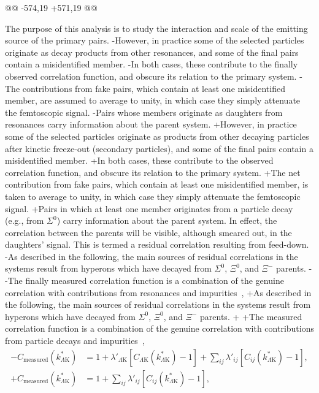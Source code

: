 @@ -574,19 +571,19 @@
 \label{ResidualCorrelations}
 
 The purpose of this analysis is to study the interaction and scale of the emitting source of the primary \LamK pairs.
-However, in practice some of the selected particles originate as decay products from other resonances, and some of the final pairs contain a misidentified member.
-In both cases, these contribute to the finally observed correlation function, and obscure its relation to the primary \LamK system.
-The contributions from fake pairs, which contain at least one misidentified member, are assumed to average to unity, in which case they simply attenuate the femtoscopic signal.
-Pairs whose members originate as daughters from resonances carry information about the parent system.
+However, in practice some of the selected particles originate as products from other decaying particles after kinetic freeze-out (secondary particles), and some of the final pairs contain a misidentified member.
+In both cases, these contribute to the observed correlation function, and obscure its relation to the primary \LamK system.
+The net contribution from fake pairs, which contain at least one misidentified member, is taken to average to unity, in which case they simply attenuate the femtoscopic signal.
+Pairs in which at least one member originates from a particle decay (e.g., \LamKchP from $\Sigma^{0}$\KchP) carry information about the parent system.
 In effect, the correlation between the parents will be visible, although smeared out, in the daughters' signal.
 This is termed a residual correlation resulting from feed-down.  
-As described in the following, the main sources of residual correlations in the \LamK systems result from \Lam hyperons which have decayed from $\Sigma^{0}$, $\Xi^{0}$, and $\Xi^{-}$ parents.
-
-The finally measured correlation function is a combination of the genuine \LamK correlation with contributions from resonances and impurities~\cite{Kisiel:2014mma},
+As described in the following, the main sources of residual correlations in the \LamK systems result from \Lam hyperons which have decayed from $\Sigma^{0}$, $\Xi^{0}$, and $\Xi^{-}$ parents. 
+
+The measured correlation function is a combination of the genuine \LamK correlation with contributions from particle decays and impurities~\cite{Kisiel:2014mma},
 \begin{equation}
 \begin{aligned}
 \label{eqn:CfwRes} 
- C_{\mathrm{measured}}(k^{*}_{\Lambda\mathrm{K}}) &= 1 + \lambda'_{\Lambda\mathrm{K}}[C_{\Lambda\mathrm{K}}(k^{*}_{\Lambda\mathrm{K}}) - 1] + \sum\limits_{ij}  \lambda'_{ij}[C_{ij}(k^{*}_{\Lambda\mathrm{K}})-1], \\
+ C_{\mathrm{measured}}(k^{*}_{\Lambda\mathrm{K}}) &= 1 + \sum\limits_{ij}  \lambda'_{ij}[C_{ij}(k^{*}_{\Lambda\mathrm{K}})-1], \\
 \end{aligned} 
 \end{equation}
